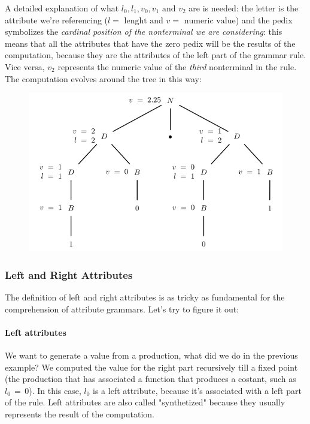 				A detailed explanation of what $l_0, l_1, v_0, v_1 \text{ and } v_2$ are is needed: the letter is the attribute we're referencing ($l = \text{ lenght and } v = \text{ numeric value}$) and the pedix symbolizes the \emph{cardinal position of the nonterminal we are considering}: this means that all the attributes that have the zero pedix will be the results of the computation, because they are the attributes of the left part of the grammar rule. Vice versa, $v_2$ represents the numeric value of the \emph{third} nonterminal in the rule.\\
				The computation evolves around the tree in this way:
				\begin{figure}[H]
					\centering
					\includegraphics[width = \textwidth]{./images/decoratedTree.png}
				\end{figure}
				
			\subsubsection{Left and Right Attributes}
				The definition of left and right attributes is as tricky as fundamental for the comprehension of attribute grammars. Let's try to figure it out:
				\paragraph{Left attributes}
					We want to generate a value from a production, what did we do in the previous example? We computed the value for the right part recursively till a fixed point (the production that has associated a function that produces a costant, such as $l_0 \,=\, 0$). In this case, $l_0$ is a left attribute, because it's associated with a left part of the rule. Left attributes are also called "synthetized" because they usually represents the result of the computation.
